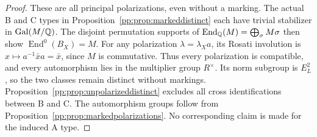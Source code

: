 \begin{proof}
These are all principal polarizations, even without a marking.
The actual B and C types in Proposition~\ref{pp:prop:markeddistinct}
each have trivial stabilizer in $\operatorname{Gal}(M/\mathbb Q)$.
The disjoint permutation supports of
$\operatorname{End}_{\mathbb Q}(M)=\bigoplus_\sigma M\sigma$
then show $\operatorname{End}^0(B_X)=M$.
For any polarization $\lambda=\lambda_Xa$, its Rosati involution is
$x\mapsto a^{-1}\bar x a=\bar x$, since $M$ is commutative.
Thus every polarization is compatible, and every automorphism lies
in the multiplier group $R^\times$. Its norm subgroup is $E_L^2$,
so the two classes remain distinct without markings.
Proposition~\ref{pp:prop:unpolarizeddistinct} excludes all cross
identifications between B and C. The automorphism groups follow
from Proposition~\ref{pp:prop:markedpolarizations}.
No corresponding claim is made for the induced A type.
\end{proof}

